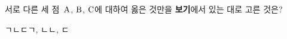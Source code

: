 서로 다른 세 점~$\mathrm{A}$, $\mathrm{B}$, $\mathrm{C}$에 대하여 옳은 것만을 \textbf{보기}에서 있는 대로 고른 것은? 
\begin{choices32}{ㄱ}{ㄴ}{ㄷ}{ㄱ, ㄴ}{ㄴ, ㄷ}\end{choices32}
